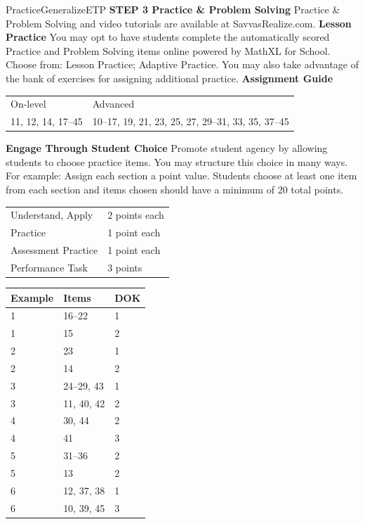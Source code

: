 \documentclass{article}
\newenvironment{item-analysis}{}{}      %
\newenvironment{te-addendum}[2]{}{}     %
\newcommand{\te}[1]{}                   %
\begin{document}
\begin{te-addendum}{Practice}{GeneralizeETP}
\textbf{STEP 3 Practice \& Problem Solving}
Practice \& Problem Solving and video tutorials are available at SavvasRealize.com.
\textbf{Lesson Practice} You may opt to have students complete the automatically scored Practice and Problem Solving items online powered by MathXL for School.
Choose from: Lesson Practice; Adaptive Practice.
You may also take advantage of the bank of exercises for assigning additional practice.
\textbf{Assignment Guide}
\begin{tabular}{ll}
On-level & Advanced \\
11, 12, 14, 17--45 & 10--17, 19, 21, 23, 25, 27, 29--31, 33, 35, 37--45 \\
\end{tabular}
\textbf{Engage Through Student Choice}
Promote student agency by allowing students to choose practice items. You may structure this choice in many ways.
For example:
Assign each section a point value. Students choose at least one item from each section and items chosen should have a minimum of 20 total points.
\begin{tabular}{ll}
Understand, Apply & 2 points each \\
Practice & 1 point each \\
Assessment Practice & 1 point each \\
Performance Task & 3 points \\
\end{tabular}
\te{Scan the QR code to access a video tutorial. See answers for 14--16, 28--29, 36--39 on next page.}
\end{te-addendum}
\begin{item-analysis}
\begin{tabular}{lll}
\toprule
Example & Items & DOK \\
\midrule
1 & 16--22 & 1 \\
1 & 15 & 2 \\
2 & 23 & 1 \\
2 & 14 & 2 \\
3 & 24--29, 43 & 1 \\
3 & 11, 40, 42 & 2 \\
4 & 30, 44 & 2 \\
4 & 41 & 3 \\
5 & 31--36 & 2 \\
5 & 13 & 2 \\
6 & 12, 37, 38 & 1 \\
6 & 10, 39, 45 & 3 \\
\bottomrule
\end{tabular}
\end{item-analysis}
\end{document}

